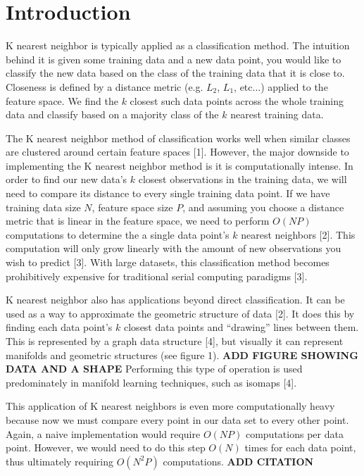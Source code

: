 \chapter{Introduction}

\vspace{5 mm}
\noindent
K nearest neighbor is typically applied as a classification method. The 
intuition behind it is given some training data and a new data point, you would 
like to classify the new data based on the class of the training data that it 
is close to. Closeness is defined by a distance metric (e.g. $L_{2}$, $L_{1}$, 
etc...) applied to the feature space. We find the $k$ closest such data points 
across the whole training data and classify based on a majority class of the 
$k$ nearest training data.

\vspace{5 mm}
\noindent
The K nearest neighbor method of classification works well when similar classes 
are clustered around certain feature spaces [1]. However, the major downside to 
implementing the K nearest neighbor method is it is computationally intense. 
In order to find our new data's $k$ closest observations in the training data, 
we will need to compare its distance to every single training data point. 
If we have training data size $N$, feature space size $P$, and assuming you 
choose a distance metric that is linear in the feature space, we need to 
perform $O(NP)$ computations to determine the a single data point's $k$ nearest 
neighbors [2]. This computation will only grow linearly with the amount of new 
observations you wish to predict [3]. With large datasets, this classification 
method becomes prohibitively expensive for traditional serial computing 
paradigms [3].


\vspace{5 mm}
\noindent
K nearest neighbor also has applications beyond direct classification. It can 
be used as a way to approximate the geometric structure of data [2]. It does 
this by finding each data point's $k$ closest data points and ``drawing'' lines 
between them. This is represented by a graph data structure [4], but visually it 
can represent manifolds and geometric structures (see figure 1).
\textbf{ADD FIGURE SHOWING DATA AND A SHAPE} 
Performing this type of operation is used predominately in manifold learning 
techniques, such as isomaps [4].

\vspace{5 mm}
\noindent
This application of K nearest neighbors is even more computationally heavy 
because now we must compare every point in our data set to every other point. 
Again, a naive implementation would require $O(NP)$ computations per data 
point. However, we would need to do this step $O(N)$ times for each data point, 
thus ultimately requiring $O(N^{2}P)$ computations.
\textbf{ADD CITATION}

